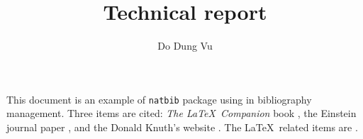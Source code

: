 \documentclass[a4paper,10pt]{article}
\title{Technical report}
\author{Do Dung Vu}
\begin{document}
\maketitle

This document is an example of \texttt{natbib} package using in bibliography management. Three items are cited: \textit{The \LaTeX\ Companion} book \cite{latexcompanion}, the Einstein journal paper \cite{einstein}, and the Donald Knuth's website \cite{knuthwebsite}. The \LaTeX\ related items are \cite{latexcompanion,knuthwebsite}. 

\medskip


\end{document}

